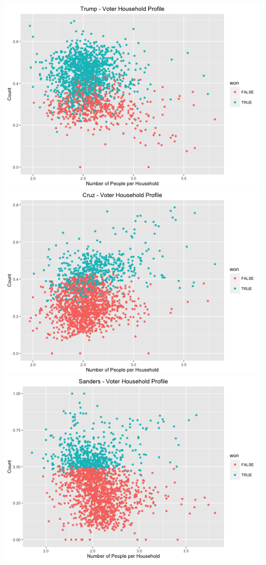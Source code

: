 \documentclass[11pt]{article}
\begin{document}
\includegraphics[scale=0.38]{../exploratory_plots/Trump_Num_People.png}
\includegraphics[scale=0.38]{../exploratory_plots/Cruz_Num_People.png}\\
\includegraphics[scale=0.38]{../exploratory_plots/Sanders_Num_People.png}	
\end{document}
